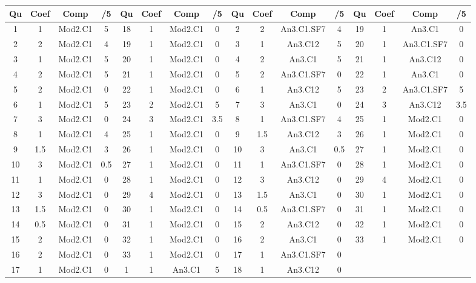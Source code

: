 \begin{center} 
\begin{tabular}{|c|c|c|c||c|c|c|c||c|c|c|c||c|c|c|c|} 
\hline \textbf{Qu} & \textbf{Coef} & \textbf{Comp} & \textbf{/5} & \textbf{Qu} & \textbf{Coef} & \textbf{Comp} & \textbf{/5} & \textbf{Qu} & \textbf{Coef} & \textbf{Comp} & \textbf{/5} & \textbf{Qu} & \textbf{Coef} & \textbf{Comp} & \textbf{/5} \\ 
\hline 
\hline 
1 & 1 & Mod2.C1 & 5 & 18 & 1 & Mod2.C1 & 0 & 2 & 2 & An3.C1.SF7 & 4 & 19 & 1 & An3.C1 & 0 \\ \hline 
2 & 2 & Mod2.C1 & 4 & 19 & 1 & Mod2.C1 & 0 & 3 & 1 & An3.C12 & 5 & 20 & 1 & An3.C1.SF7 & 0 \\ \hline 
3 & 1 & Mod2.C1 & 5 & 20 & 1 & Mod2.C1 & 0 & 4 & 2 & An3.C1 & 5 & 21 & 1 & An3.C12 & 0 \\ \hline 
4 & 2 & Mod2.C1 & 5 & 21 & 1 & Mod2.C1 & 0 & 5 & 2 & An3.C1.SF7 & 0 & 22 & 1 & An3.C1 & 0 \\ \hline 
5 & 2 & Mod2.C1 & 0 & 22 & 1 & Mod2.C1 & 0 & 6 & 1 & An3.C12 & 5 & 23 & 2 & An3.C1.SF7 & 5 \\ \hline 
6 & 1 & Mod2.C1 & 5 & 23 & 2 & Mod2.C1 & 5 & 7 & 3 & An3.C1 & 0 & 24 & 3 & An3.C12 & 3.5 \\ \hline 
7 & 3 & Mod2.C1 & 0 & 24 & 3 & Mod2.C1 & 3.5 & 8 & 1 & An3.C1.SF7 & 4 & 25 & 1 & Mod2.C1 & 0 \\ \hline 
8 & 1 & Mod2.C1 & 4 & 25 & 1 & Mod2.C1 & 0 & 9 & 1.5 & An3.C12 & 3 & 26 & 1 & Mod2.C1 & 0 \\ \hline 
9 & 1.5 & Mod2.C1 & 3 & 26 & 1 & Mod2.C1 & 0 & 10 & 3 & An3.C1 & 0.5 & 27 & 1 & Mod2.C1 & 0 \\ \hline 
10 & 3 & Mod2.C1 & 0.5 & 27 & 1 & Mod2.C1 & 0 & 11 & 1 & An3.C1.SF7 & 0 & 28 & 1 & Mod2.C1 & 0 \\ \hline 
11 & 1 & Mod2.C1 & 0 & 28 & 1 & Mod2.C1 & 0 & 12 & 3 & An3.C12 & 0 & 29 & 4 & Mod2.C1 & 0 \\ \hline 
12 & 3 & Mod2.C1 & 0 & 29 & 4 & Mod2.C1 & 0 & 13 & 1.5 & An3.C1 & 0 & 30 & 1 & Mod2.C1 & 0 \\ \hline 
13 & 1.5 & Mod2.C1 & 0 & 30 & 1 & Mod2.C1 & 0 & 14 & 0.5 & An3.C1.SF7 & 0 & 31 & 1 & Mod2.C1 & 0 \\ \hline 
14 & 0.5 & Mod2.C1 & 0 & 31 & 1 & Mod2.C1 & 0 & 15 & 2 & An3.C12 & 0 & 32 & 1 & Mod2.C1 & 0 \\ \hline 
15 & 2 & Mod2.C1 & 0 & 32 & 1 & Mod2.C1 & 0 & 16 & 2 & An3.C1 & 0 & 33 & 1 & Mod2.C1 & 0 \\ \hline 
16 & 2 & Mod2.C1 & 0 & 33 & 1 & Mod2.C1 & 0 & 17 & 1 & An3.C1.SF7 & 0 &  &  &  &  \\ \hline 

17 & 1 & Mod2.C1 & 0 & 1 & 1 & An3.C1 & 5 & 18 & 1 & An3.C12 & 0 &  &  &  &  \\ \hline 

\end{tabular} 
\end{center} 
\normalsize 
 
